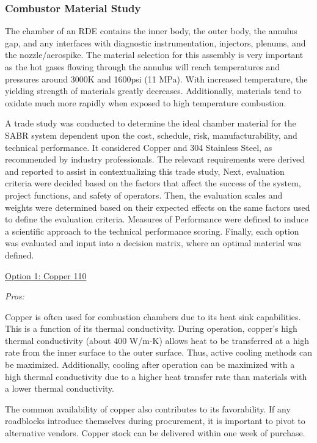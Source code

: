 \subsubsection{Combustor Material Study}

The chamber of an RDE contains the inner body, the outer body, the annulus gap, and any interfaces with diagnostic instrumentation, injectors, plenums, and the nozzle/aerospike. The material selection for this assembly is very important as the hot gases flowing through the annulus will reach temperatures and pressures around 3000K and 1600psi (11 MPa). With increased temperature, the yielding strength of materials greatly decreases. Additionally, materials tend to oxidate much more rapidly when exposed to high temperature combustion. 

A trade study was conducted to determine the ideal chamber material for the SABR system dependent upon the cost, schedule, risk, manufacturability, and technical performance. It considered Copper and 304 Stainless Steel, as recommended by industry professionals. The relevant requirements were derived and reported to assist in contextualizing this trade study, Next, evaluation criteria were decided based on the factors that affect the success of the system, project functions, and safety of operators. Then, the evaluation scales and weights were determined based on their expected effects on the same factors used to define the evaluation criteria. Measures of Performance were defined to induce a scientific approach to the technical performance scoring. Finally, each option was evaluated and input into a decision matrix, where an optimal material was defined.

\noindent\underline{Option 1: Copper 110}

\noindent\textit{Pros:}

Copper is often used for combustion chambers due to its heat sink capabilities. This is a function of its thermal conductivity. During operation, copper’s high thermal conductivity (about 400 W/m-K) allows heat to be transferred at a high rate from the inner surface to the outer surface. Thus, active cooling methods can be maximized. Additionally, cooling after operation can be maximized with a high thermal conductivity due to a higher heat transfer rate than materials with a lower thermal conductivity. 

The common availability of copper also contributes to its favorability. If any roadblocks introduce themselves during procurement, it is important to pivot to alternative vendors. Copper stock can be delivered within one week of purchase.

